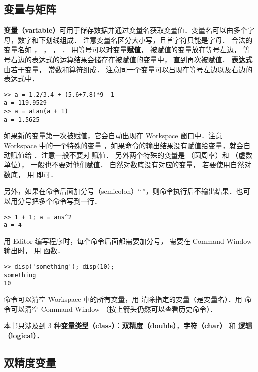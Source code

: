 

\subsection{变量与矩阵}
\textbf{变量（variable）}可用于储存数据并通过变量名获取变量值．变量名可以由多个字母，数字和下划线组成． 注意变量名区分大小写，且首字符只能是字母． 合法的变量名如 ， ， ， ． 用等号可以对变量\textbf{赋值}， 被赋值的变量放在等号左边， 等号右边的表达式的运算结果会储存在被赋值的变量中， 直到再次被赋值． \textbf{表达式}由若干变量， 常数和算符组成． 注意同一个变量可以出现在等号左边以及右边的表达式中．
\begin{lstlisting}[language=MatlabCom]
>> a = 1.2/3.4 + (5.6+7.8)*9 -1
a = 119.9529
>> a = atan(a + 1)
a = 1.5625
\end{lstlisting}
如果新的变量第一次被赋值，它会自动出现在 Workspace 窗口中．注意 Workspace 中的一个特殊的变量 ，如果命令的输出结果没有赋值给变量，就会自动赋值给 ．注意一般不要对  赋值． 另外两个特殊的变量是  （圆周率）和  （虚数单位）， 一般也不要对他们赋值． 自然对数底没有对应的变量， 若要使用自然对数底， 用  即可．

另外，如果在命令后面加分号（semicolon）“\,\x{;}”，则命令执行后不输出结果．也可以用分号把多个命令写到一行．
\begin{lstlisting}[language=MatlabCom]
>> 1 + 1; a = ans^2
a = 4
\end{lstlisting}
用 Editor 编写程序时，每个命令后面都需要加分号， 需要在 Command Window 输出时， 用  函数．
\begin{lstlisting}[language=MatlabCom]
>> disp('something'); disp(10);
something
10
\end{lstlisting}

 命令可以清空 Workspace 中的所有变量，用  清除指定的变量（是变量名）．用  命令可以清空 Command Window （按上箭头仍然可以查看历史命令）．

本书只涉及到 3 种\textbf{变量类型（class）}：\textbf{双精度（double）}，\textbf{字符（char）} 和 \textbf{逻辑（logical）．}

\subsection{双精度变量}

